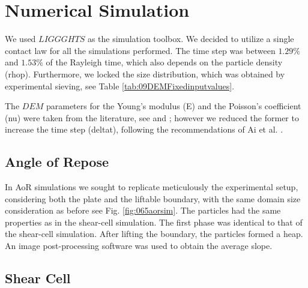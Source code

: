 
\chapter{Numerical Simulation}
\label{cap:numericalsimulation}


We used $LIGGGHTS$ as the simulation toolbox.
We decided to utilize a single
contact law for all the simulations performed.
The time step was between $1.29 \%$ and $1.53 \%$ of the Rayleigh time, which
also depends on the particle density (\ac{rhop}).
Furthermore, we locked the size distribution, which was obtained by experimental
sieving, see Table \ref{tab:09DEMFixedinputvalues}.

The $DEM$ parameters for the Young's modulus (\ac{E}) and the Poisson's coefficient
(\ac{nu}) were taken from the literature, see \cite{RefWorks:175} 
and \cite{RefWorks:176}; however we reduced the former to increase the time step
(\ac{deltat}), following the recommendations of Ai et al. \cite{RefWorks:131}.


\section{Angle of Repose}
\label{sec:aorsim}

In \ac{AoR} simulations we sought to replicate meticulously the experimental setup, 
considering both the plate and the liftable boundary, with the same domain size consideration as before
see Fig. \ref{fig:065aorsim}. 
The particles had the same properties as in the shear-cell simulation. 
The first phase was identical to that of the shear-cell simulation. 
After lifting the boundary, the particles formed a heap.
An image post-processing software was used to obtain the average slope.


\section{Shear Cell}
\label{sec:scsimulation}

